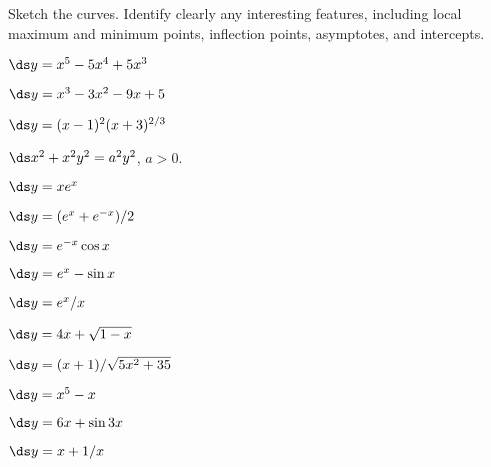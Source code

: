 \begin{enumialphparenastyle}

Sketch the curves. Identify clearly any interesting features, including
local maximum and minimum points, inflection points, asymptotes, and
intercepts. 

\begin{ex}
	$\ds y=x^5-5x^4+5x^3$
\end{ex}

\begin{ex}
	$\ds y=x^3-3x^2-9x+5$
\end{ex}

\begin{ex}
	$\ds y=(x-1)^2(x+3)^{2/3}$
\end{ex}

\begin{ex}
	$\ds x^2+x^2y^2=a^2y^2$, $a>0$.
\end{ex}

\begin{ex}
	$\ds y=xe^x$
\end{ex}

\begin{ex}
	$\ds y=(e^x+e^{-x})/2$
\end{ex}

\begin{ex}
	$\ds y=e^{-x}\cos x$
\end{ex}

\begin{ex}
	$\ds y=e^x-\sin x$
\end{ex}

\begin{ex}
	$\ds y=e^x/x$
\end{ex}

\begin{ex}
	$\ds y = 4x+\sqrt{1-x}$
\end{ex}

\begin{ex}
	$\ds y = (x+1)/\sqrt{5x^2 + 35}$
\end{ex}

\begin{ex}
	$\ds y= x^5 - x$
\end{ex}

\begin{ex}
	$\ds y = 6x + \sin 3x$
\end{ex}

\begin{ex}
	$\ds y = x+ 1/x$
\end{ex}


\end{enumialphparenastyle}
